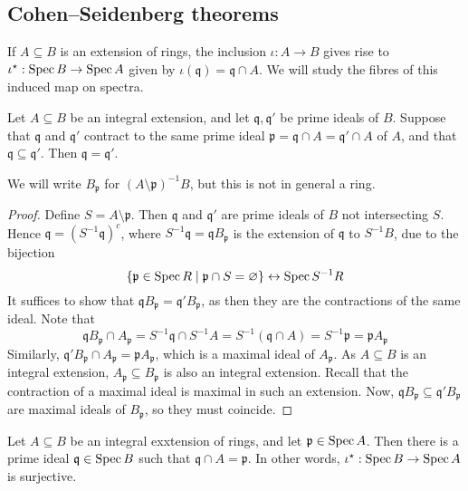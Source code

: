 \subsection{Cohen--Seidenberg theorems}
If \( A \subseteq B \) is an extension of rings, the inclusion \( \iota : A \to B \) gives rise to \( \iota^\star : \operatorname{Spec} B \to \operatorname{Spec} A \) given by \( \iota(\mathfrak q) = \mathfrak q \cap A \).
We will study the fibres of this induced map on spectra.
\begin{proposition}[incomparability]
    Let \( A \subseteq B \) be an integral extension, and let \( \mathfrak q, \mathfrak q' \) be prime ideals of \( B \).
    Suppose that \( \mathfrak q \) and \( \mathfrak q' \) contract to the same prime ideal \( \mathfrak p = \mathfrak q \cap A = \mathfrak q' \cap A \) of \( A \), and that \( \mathfrak q \subseteq \mathfrak q' \).
    Then \( \mathfrak q = \mathfrak q' \).
\end{proposition}
We will write \( B_{\mathfrak p} \) for \( (A \setminus \mathfrak p)^{-1} B \), but this is not in general a ring.
\begin{proof}
    Define \( S = A \setminus \mathfrak p \).
    Then \( \mathfrak q \) and \( \mathfrak q' \) are prime ideals of \( B \) not intersecting \( S \).
    Hence \( \mathfrak q = (S^{-1} \mathfrak q)^c \), where \( S^{-1} \mathfrak q = \mathfrak q B_{\mathfrak p} \) is the extension of \( \mathfrak q \) to \( S^{-1} B \), due to the bijection
    \[ \qty{\mathfrak p \in \operatorname{Spec}R \mid \mathfrak p \cap S = \varnothing} \leftrightarrow \operatorname{Spec} S^{-1}R \]
    It suffices to show that \( \mathfrak q B_{\mathfrak p} = \mathfrak q' B_{\mathfrak p} \), as then they are the contractions of the same ideal.
    Note that
    \[ \mathfrak q B_{\mathfrak p} \cap A_{\mathfrak p} = S^{-1} \mathfrak q \cap S^{-1} A = S^{-1} (\mathfrak q \cap A) = S^{-1} \mathfrak p = \mathfrak p A_{\mathfrak p} \]
    Similarly, \( \mathfrak q' B_{\mathfrak p} \cap A_{\mathfrak p} = \mathfrak p A_{\mathfrak p} \), which is a maximal ideal of \( A_{\mathfrak p} \).
    As \( A \subseteq B \) is an integral extension, \( A_{\mathfrak p} \subseteq B_{\mathfrak p} \) is also an integral extension.
    Recall that the contraction of a maximal ideal is maximal in such an extension.
    Now, \( \mathfrak q B_{\mathfrak p} \subseteq \mathfrak q' B_{\mathfrak p} \) are maximal ideals of \( B_{\mathfrak p} \), so they must coincide.
\end{proof}
\begin{proposition}
    Let \( A \subseteq B \) be an integral exxtension of rings, and let \( \mathfrak p \in \operatorname{Spec} A \).
    Then there is a prime ideal \( \mathfrak q \in \operatorname{Spec} B \) such that \( \mathfrak q \cap A = \mathfrak p \).
    In other words, \( \iota^\star : \operatorname{Spec} B \to \operatorname{Spec} A \) is surjective.
\end{proposition}
